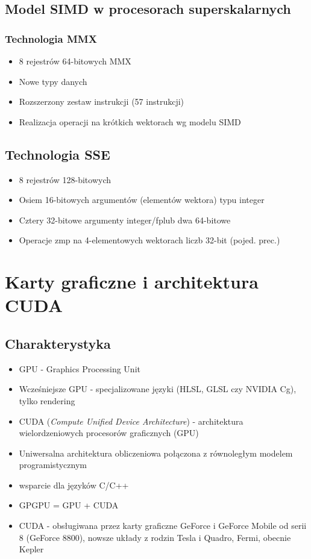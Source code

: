	\subsection{Model SIMD w procesorach superskalarnych}
		\subsubsection{Technologia MMX}
			\begin{itemize}
				\item 8 rejestrów 64-bitowych MMX
				\item Nowe typy danych
				\item Rozszerzony zestaw instrukcji (57 instrukcji)
				\item Realizacja operacji na krótkich wektorach wg modelu SIMD
			\end{itemize}
	\subsection{Technologia SSE}
		\begin{itemize}
			\item 8 rejestrów 128-bitowych
			\item Osiem 16-bitowych argumentów (elementów wektora) typu integer
			\item Cztery 32-bitowe argumenty integer/fplub dwa 64-bitowe
			\item Operacje zmp na 4-elementowych wektorach liczb 32-bit (pojed. prec.)
		\end{itemize}

\section{Karty graficzne i architektura CUDA}
	\subsection{Charakterystyka}
		\begin{itemize}
			\item GPU - Graphics Processing Unit
			\item Wcześniejsze GPU - specjalizowane języki (HLSL, GLSL czy NVIDIA Cg), tylko rendering
			\item CUDA (\emph{Compute Unified Device Architecture}) - architektura wielordzeniowych procesorów graficznych (GPU)
			\item Uniwersalna architektura obliczeniowa połączona z równoległym modelem programistycznym
			\item wsparcie dla języków C/C++
			\item GPGPU = GPU + CUDA
			\item CUDA - obsługiwana przez karty graficzne GeForce i GeForce Mobile od serii 8 (GeForce 8800), nowsze układy z rodzin Tesla i Quadro, Fermi, obecnie Kepler
		\end{itemize}

